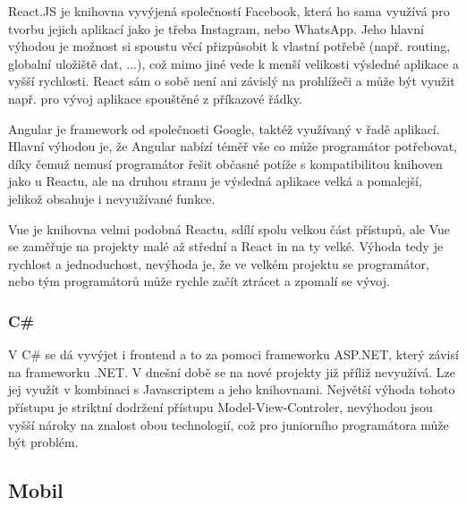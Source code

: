 React.JS je knihovna vyvýjená společností Facebook, která ho sama využívá pro tvorbu jejich aplikací jako je třeba Instagram, nebo WhatsApp. Jeho hlavní výhodou je možnost si spoustu věcí přizpůsobit k vlastní potřebě (např. routing, globalní uložiště dat, ...), což mimo jiné vede k menší velikosti výsledné aplikace a vyšší rychlosti. React sám o sobě není ani závislý na prohlížeči a může být využit např. pro vývoj aplikace spouštěné z příkazové řádky.

Angular je framework od společnosti Google, taktéž využívaný v řadě aplikací. Hlavní výhodou je, že Angular nabízí téměř vše co může programátor potřebovat, díky čemuž nemusí programátor řešit občasné potíže s kompatibilitou knihoven jako u Reactu, ale na druhou stranu je výsledná aplikace velká a pomalejší, jelikož obsahuje i nevyužívané funkce.

Vue je knihovna velmi podobná Reactu, sdílí spolu velkou část přístupů, ale Vue se zaměřuje na projekty malé až střední a React in na ty velké. Výhoda tedy je rychlost a jednoduchost, nevýhoda je, že ve velkém projektu se programátor, nebo tým programátorů může rychle začít ztrácet a zpomalí se vývoj.

\subsubsection{C\# }
V C\# se dá vyvýjet i frontend a to za pomoci frameworku ASP.NET, který závisí na frameworku .NET. V dnešní době se na nové projekty již příliž nevyužívá. Lze jej využít v kombinaci s Javascriptem a jeho knihovnami. Největší výhoda tohoto přístupu je striktní dodržení přístupu Model-View-Controler, nevýhodou jsou vyšší nároky na znalost obou technologií, což pro juniorního programátora může být problém.

\subsection{Mobil}
\label{ss:mobile}
